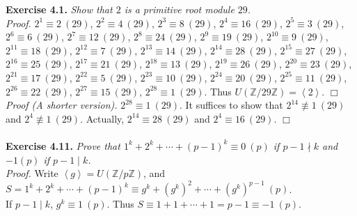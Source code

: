 \documentclass{article}
\begin{document}
\textbf{Exercise 4.1.} \emph{Show that $2$ is a primitive root module $29$.}\\

\emph{Proof.}
$2^1 \equiv 2 \: (29)$,
$2^2 \equiv 4 \: (29)$,
$2^3 \equiv 8 \: (29)$,
$2^4 \equiv 16 \: (29)$,
$2^5 \equiv 3 \: (29)$,
$2^6 \equiv 6 \: (29)$,
$2^7 \equiv 12 \: (29)$,
$2^8 \equiv 24 \: (29)$,
$2^9 \equiv 19 \: (29)$,
$2^{10} \equiv 9 \: (29)$,
$2^{11} \equiv 18 \: (29)$,
$2^{12} \equiv 7 \: (29)$,
$2^{13} \equiv 14 \: (29)$,
$2^{14} \equiv 28 \: (29)$,
$2^{15} \equiv 27 \: (29)$,
$2^{16} \equiv 25 \: (29)$,
$2^{17} \equiv 21 \: (29)$,
$2^{18} \equiv 13 \: (29)$,
$2^{19} \equiv 26 \: (29)$,
$2^{20} \equiv 23 \: (29)$,
$2^{21} \equiv 17 \: (29)$,
$2^{22} \equiv 5 \: (29)$,
$2^{23} \equiv 10 \: (29)$,
$2^{24} \equiv 20 \: (29)$,
$2^{25} \equiv 11 \: (29)$,
$2^{26} \equiv 22 \: (29)$,
$2^{27} \equiv 15 \: (29)$,
$2^{28} \equiv 1 \: (29)$. Thus
$U(\mathbb{Z}/29\mathbb{Z}) = \left \langle 2 \right \rangle$.
$\Box$ \\

\emph{Proof (A shorter version).}
$2^{28} \equiv 1 \: (29)$.
It suffices to show that
$2^{14} \not\equiv 1 \: (29)$ and $2^{4} \not\equiv 1 \: (29)$.
Actually, $2^{14} \equiv 28 \: (29)$ and $2^{4} \equiv 16 \: (29)$.
$\Box$ \\\\



\textbf{Exercise 4.11.} \emph{Prove that $1^k + 2^k + \cdots + (p-1)^k \equiv 0 \: (p)$
if $p - 1 \nmid k$ and $-1 (p)$ if $p - 1 \mid k$.} \\

\emph{Proof.}
Write $\left \langle g \right \rangle = U(\mathbb{Z}/p\mathbb{Z})$, and
$S = 1^k + 2^k + \cdots + (p-1)^k \equiv g^k + (g^k)^2 + \cdots + (g^k)^{p - 1} \: (p)$. \\

If $p - 1 \mid k$, $g^k \equiv 1 \: (p)$. Thus
$S \equiv 1 + 1 + \cdots + 1 = p - 1 \equiv -1 \: (p)$. \\
\end{document}
